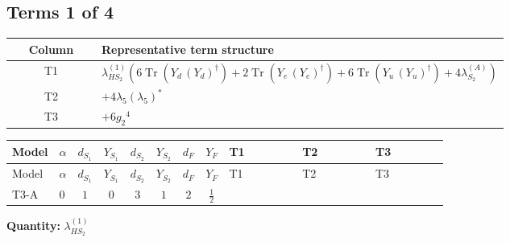 \documentclass[8pt]{article}
\begin{document}
\begin{landscape}
\subsection*{Terms 1 of 4}
\begin{center}
\begin{tabular}{@{}c >{\raggedright\arraybackslash}p{0.82\linewidth}@{}}
\toprule
Column & Representative term structure \\
\midrule
T1 & \(\displaystyle {\lambda_{HS_2}^{(1)}} (6 \operatorname{Tr}\!\left({Y_d}\,\left({Y_d}\right)^{\dagger}\right)+2 \operatorname{Tr}\!\left({Y_e}\,\left({Y_e}\right)^{\dagger}\right)+6 \operatorname{Tr}\!\left({Y_u}\,\left({Y_u}\right)^{\dagger}\right)+4 {\lambda_{S_2}^{(A)}})\) \\
\midrule
T2 & \(\displaystyle +4 {\lambda_5} \left({\lambda_5}\right)^{*}\) \\
\midrule
T3 & \(\displaystyle +6 {g_2}^4\) \\
\midrule
\bottomrule
\end{tabular}
\end{center}
\smallskip
\tiny
\begin{longtable}{@{}llcccccc >{\raggedright\arraybackslash}p{0.21\linewidth} >{\raggedright\arraybackslash}p{0.21\linewidth} >{\raggedright\arraybackslash}p{0.21\linewidth}@{}}
\toprule
Model & $\alpha$ & $d_{S_1}$ & $Y_{S_1}$ & $d_{S_2}$ & $Y_{S_2}$ & $d_F$ & $Y_F$ & T1 & T2 & T3 \\
\midrule
\endfirsthead
\toprule
Model & $\alpha$ & $d_{S_1}$ & $Y_{S_1}$ & $d_{S_2}$ & $Y_{S_2}$ & $d_F$ & $Y_F$ & T1 & T2 & T3 \\
\midrule
\endhead
T3-A & $0$ & $1$ & $0$ & $3$ & $1$ & $2$ & $\frac{1}{2}$ & \scriptsize\adjustbox{max width=\linewidth}{$\begin{gathered} {\lambda_{HS_2}^{(1)}} (6 \operatorname{Tr}\!\left({Y_d}\,\left({Y_d}\right)^{\dagger}\right)+2 \operatorname{Tr}\!\left({Y_e}\,\left({Y_e}\right)^{\dagger}\right)+6 \operatorname{Tr}\!\left({Y_u}\,\left({Y_u}\right)^{\dagger}\right)+4 {\lambda_{S_2}^{(A)}})\end{gathered}$} & \scriptsize\adjustbox{max width=\linewidth}{$\begin{gathered} +4 {\lambda_5} \left({\lambda_5}\right)^{*}\end{gathered}$} & \scriptsize\adjustbox{max width=\linewidth}{$\begin{gathered} +6 {g_2}^4\end{gathered}$} \\
\midrule
\bottomrule
\end{longtable}
\clearpage
\noindent\textbf{Quantity: }$\lambda_{HS_2}^{(1)}$\par\smallskip

\end{landscape}
\end{document}
